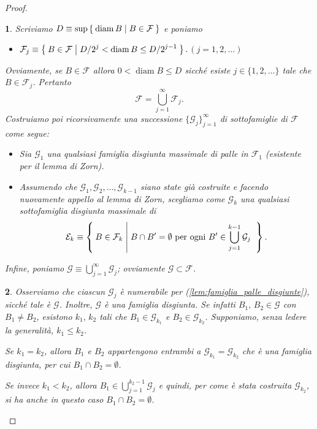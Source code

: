 \documentclass[a4paper,10pt,openright,oneside]{book}
\theoremstyle{theoremstyle}
\theoremstyle{theoremstylewoheader}
\theoremstyle{theoremstyle}
\theoremstyle{proofsecstyle}
\newtheorem{proofsec}{}
\theoremstyle{nonumberplain}
\newtheorem{proof}{Dim.}
\newcommand{\EE}{\ensuremath{\mathcal{E}}}
\newcommand{\FF}{\ensuremath{\mathcal{F}}}
\newcommand{\GG}{\ensuremath{\mathcal{G}}}
\DeclareMathOperator{\diam}{diam}
\newcommand{\mymath}[2]{\begin{itemize}%
  \item[]\hfill\hbox{}\ensuremath{\displaystyle #1}\hfill\ensuremath{\displaystyle #2}%
  \end{itemize}}
\begin{document}
\begin{proof}
\begin{proofsec}
Scriviamo $D \equiv \sup\Set{ \diam B | B \in \FF }$ e poniamo \mymath{\FF_j \equiv \Set { B \in \FF | D/2^j < \diam B \le D/2^{j-1}}.}{(j = 1, 2, \ldots)} Ovviamente, se $B \in \FF$ allora $0 < \diam B \le D$ sicché esiste $j \in \{1, 2, \ldots\}$ tale che $B \in \FF_j$. Pertanto
\[
\FF = \bigcup_{j=1}^\infty \FF_j.
\]
Costruiamo poi ricorsivamente una successione $\{\GG_j\}_{j=1}^\infty$ di sottofamiglie di $\FF$ come segue:
\begin{itemize}
\item[($\alpha$)] Sia $\GG_1$ una qualsiasi famiglia disgiunta massimale di palle in $\FF_1$ (esistente per il lemma di Zorn).
\item[($\beta$)] Assumendo che $\GG_1, \GG_2, \ldots, \GG_{k-1}$ siano state già costruite e facendo nuovamente appello al lemma di Zorn, scegliamo come $\GG_k$ una qualsiasi sottofamiglia disgiunta massimale di
\[
\EE_k \equiv \Set { B \in \FF_k | B \cap B' = \emptyset \text{ per ogni $B' \in \bigcup_{j=1}^{k-1} \GG_j$ } }.
\]
\end{itemize}
Infine, poniamo $\GG \equiv \bigcup_{j=1}^\infty \GG_j$; ovviamente $\GG \subset \FF$.
\end{proofsec}

\begin{proofsec}
Osserviamo che ciascun $\GG_j$ è numerabile per (\ref{lem:famiglia_palle_disgiunte}), sicché tale è $\GG$. Inoltre, $\GG$ è una famiglia \emph{disgiunta}. Se infatti $B_1,\, B_2 \in \GG$ con $B_1 \ne B_2$, esistono $k_1,\, k_2$ tali che $B_1 \in \GG_{k_1}$ e $B_2 \in \GG_{k_2}$. Supponiamo, senza ledere la generalità, $k_1 \le k_2$.

Se $k_1 = k_2$, allora $B_1$ e $B_2$ appartengono entrambi a $\GG_{k_1} = \GG_{k_2}$ che è una famiglia disgiunta, per cui $B_1	\cap B_2 = \emptyset$.

Se invece $k_1 < k_2$, allora $B_1 \in \bigcup_{j=1}^{k_2 - 1} \GG_j$ e quindi, per come è stata costruita $\GG_{k_2}$, si ha anche in questo caso $B_1 \cap B_2 = \emptyset$.
\end{proofsec}


\end{proof}
\end{document}
